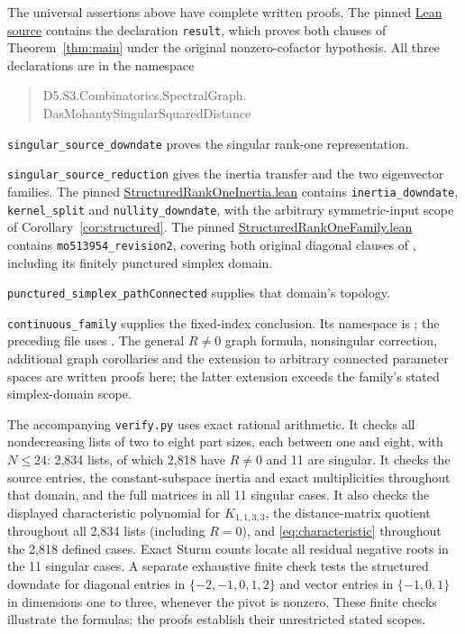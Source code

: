 \documentclass[11pt]{article}
\begin{document}
The universal assertions above have complete written proofs. The pinned
\href{https://github.com/the-omega-institute/trureturing/blob/a2d277ea0980f1230eff2c7e27838372effccb30/D5/S3/Combinatorics/SpectralGraph/DasMohantySingularSquaredDistance.lean}{Lean source}
contains the declaration \texttt{result}, which proves both clauses of
Theorem~\ref{thm:main} under the original nonzero-cofactor hypothesis.
All three declarations are in the namespace
\begin{quote}\small\ttfamily
D5.S3.Combinatorics.SpectralGraph.\\
DasMohantySingularSquaredDistance
\end{quote}
\noindent
\texttt{singular\_source\_downdate} proves the singular rank-one representation.
\par\noindent
\texttt{singular\_source\_reduction} gives the inertia transfer and the two
eigenvector families.
The pinned
\href{https://github.com/the-omega-institute/trureturing/blob/a2d277ea0980f1230eff2c7e27838372effccb30/D5/S3/QuadraticForms/StructuredRankOneInertia.lean}{StructuredRankOneInertia.lean}
contains \texttt{inertia\_downdate}, \texttt{kernel\_split} and
\texttt{nullity\_downdate}, with the arbitrary symmetric-input scope
of Corollary~\ref{cor:structured}. The pinned
\href{https://github.com/the-omega-institute/trureturing/blob/a2d277ea0980f1230eff2c7e27838372effccb30/D5/S3/QuadraticForms/StructuredRankOneFamily.lean}{StructuredRankOneFamily.lean}
contains \texttt{mo513954\_revision2}, covering both original diagonal
clauses of \cite{Lucid}, including its finitely punctured simplex domain.
\par\noindent
\texttt{punctured\_simplex\_pathConnected} supplies that domain's topology.
\par\noindent
\texttt{continuous\_family} supplies the fixed-index conclusion.
Its namespace is
; the preceding
file uses .
The general $R\ne0$ graph formula, nonsingular correction, additional
graph corollaries and the extension to arbitrary connected parameter spaces
are written proofs here; the latter extension exceeds the family's
stated simplex-domain scope.

The accompanying \texttt{verify.py} uses exact rational arithmetic. It checks
all nondecreasing lists of two to eight part sizes, each between one and eight,
with $N\le24$: 2,834 lists, of which 2,818 have $R\ne0$ and 11 are singular.
It checks the source entries, the constant-subspace inertia and exact
multiplicities throughout that domain, and the full matrices in all 11 singular
cases. It also checks the displayed characteristic polynomial for $K_{1,1,3,3}$,
the distance-matrix quotient throughout all 2,834 lists (including $R=0$),
and \eqref{eq:characteristic} throughout the 2,818 defined cases.
Exact Sturm counts locate all residual negative roots in the 11 singular
cases. A separate exhaustive finite check tests the structured downdate
for diagonal entries in $\{-2,-1,0,1,2\}$ and vector entries in
$\{-1,0,1\}$ in dimensions one to three, whenever the pivot is nonzero.
These finite checks illustrate the formulas; the proofs establish their
unrestricted stated scopes.
\end{document}
